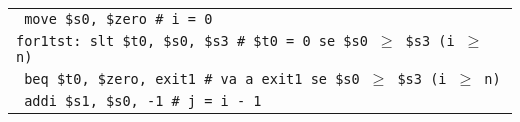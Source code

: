 \documentclass[../main.tex]{subfiles}
\begin{document}
\begin{tabular}{ l }
    \texttt{\hspace*{0cm} \hspace*{0cm} \hspace*{0cm} \hspace*{0cm} \hspace*{0cm} \hspace*{0cm} \hspace*{0cm} \hspace*{0cm} \hspace*{0cm} move \$s0, \$zero \hspace*{0cm} \hspace*{0cm} \hspace*{0cm} \hspace*{0cm} \hspace*{0cm} \hspace*{0cm} \hspace*{0cm} \# i = 0} \\
    \texttt{for1tst:\hspace*{0cm} slt \$t0, \$s0, \$s3 \hspace*{0cm} \hspace*{0cm} \hspace*{0cm} \hspace*{0cm} \hspace*{0cm} \# \$t0 = 0 se \$s0 $\geq$ \$s3 (i $\geq$ n)} \\
    \hline
    \hline
    \texttt{\hspace*{0cm} \hspace*{0cm} \hspace*{0cm} \hspace*{0cm} \hspace*{0cm} \hspace*{0cm} \hspace*{0cm} \hspace*{0cm} \hspace*{0cm} beq \$t0, \$zero, exit1 \hspace*{0cm} \# va a exit1 se \$s0 $\geq$ \$s3 (i $\geq$ n)} \\
    \texttt{\hspace*{0cm} \hspace*{0cm} \hspace*{0cm} \hspace*{0cm} \hspace*{0cm} \hspace*{0cm} \hspace*{0cm} \hspace*{0cm} \hspace*{0cm} addi \$s1, \$s0, -1 \hspace*{0cm} \hspace*{0cm} \hspace*{0cm} \hspace*{0cm} \hspace*{0cm} \# j = i - 1} \\

\end{tabular}
\end{document}
